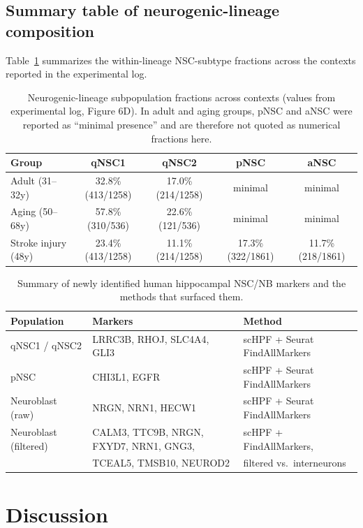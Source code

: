 \documentclass[11pt]{article}
\begin{document}
\subsection{Summary table of neurogenic-lineage composition}

Table~\ref{tab:lineage} summarizes the within-lineage NSC-subtype fractions
across the contexts reported in the experimental log.

\begin{table}[htbp]
\centering
\caption{Neurogenic-lineage subpopulation fractions across contexts (values
from experimental log, Figure 6D). In adult and aging groups, pNSC and
aNSC were reported as ``minimal presence'' and are therefore not quoted
as numerical fractions here.}
\label{tab:lineage}
\begin{tabular}{lcccc}
\toprule
Group & qNSC1 & qNSC2 & pNSC & aNSC \\
\midrule
Adult (31--32y) & 32.8\% (413/1258) & 17.0\% (214/1258) & minimal & minimal \\
Aging (50--68y) & 57.8\% (310/536) & 22.6\% (121/536) & minimal & minimal \\
Stroke injury (48y) & 23.4\% (413/1258) & 11.1\% (214/1258) & 17.3\% (322/1861) & 11.7\% (218/1861) \\
\bottomrule
\end{tabular}
\end{table}

\begin{table}[htbp]
\centering
\caption{Summary of newly identified human hippocampal NSC/NB markers and
the methods that surfaced them.}
\label{tab:markers}
\begin{tabular}{lll}
\toprule
Population & Markers & Method \\
\midrule
qNSC1 / qNSC2 & LRRC3B, RHOJ, SLC4A4, GLI3 & scHPF + Seurat FindAllMarkers \\
pNSC & CHI3L1, EGFR & scHPF + Seurat FindAllMarkers \\
Neuroblast (raw) & NRGN, NRN1, HECW1 & scHPF + Seurat FindAllMarkers \\
Neuroblast (filtered) & CALM3, TTC9B, NRGN, FXYD7, NRN1, GNG3, & scHPF + FindAllMarkers, \\
                      & TCEAL5, TMSB10, NEUROD2 & filtered vs.\ interneurons \\
\bottomrule
\end{tabular}
\end{table}

\section{Discussion}
\end{document}
